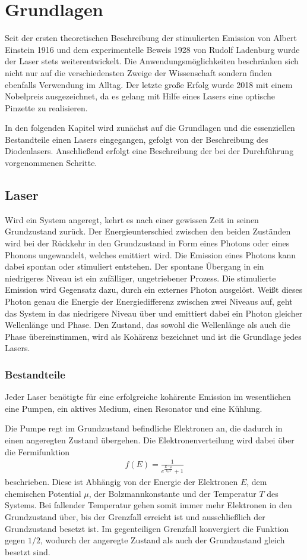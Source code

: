 \section{Grundlagen}
\label{sec:Grundlagen}
Seit der ersten theoretischen Beschreibung der stimulierten Emission von Albert Einstein 1916 und dem experimentelle Beweis 1928 von Rudolf Ladenburg wurde der Laser stets weiterentwickelt. Die Anwendungsmöglichkeiten beschränken sich nicht nur auf die verschiedensten Zweige der Wissenschaft sondern finden ebenfalls Verwendung im Alltag. Der letzte große Erfolg wurde 2018 mit einem Nobelpreis ausgezeichnet, da es gelang mit Hilfe eines Lasers eine optische Pinzette zu realisieren.

In den folgenden Kapitel wird zunächst auf die Grundlagen und die essenziellen Bestandteile einen Lasers eingegangen, gefolgt von der Beschreibung des Diodenlasers. Anschließend erfolgt eine Beschreibung der bei der Durchführung vorgenommenen Schritte.

\subsection{Laser}
Wird ein System angeregt, kehrt es nach einer gewissen Zeit in seinen Grundzustand zurück. Der Energieunterschied zwischen den beiden Zuständen wird bei der Rückkehr in den Grundzustand in Form eines Photons oder eines Phonons ungewandelt, welches emittiert wird. Die Emission eines Photons kann dabei spontan oder stimuliert entstehen. Der spontane Übergang in ein niedrigeres Niveau ist ein zufälliger, ungetriebener Prozess. Die stimulierte Emission wird Gegensatz dazu, durch ein externes Photon ausgelöst. Weißt dieses Photon genau die Energie der Energiedifferenz zwischen zwei Niveaus auf, geht das System in das niedrigere Niveau über und emittiert dabei ein Photon gleicher Wellenlänge und Phase. Den Zustand, das sowohl die Wellenlänge als auch die Phase übereinstimmen, wird als Kohärenz bezeichnet und ist die Grundlage jedes Lasers.

\subsubsection{Bestandteile}
\label{sec:Bestandteile}
Jeder Laser benötigte für eine erfolgreiche kohärente Emission im wesentlichen eine Pumpen, ein aktives Medium, einen Resonator und eine Kühlung.

Die Pumpe regt im Grundzustand befindliche Elektronen an, die dadurch in einen angeregten Zustand übergehen. Die Elektronenverteilung wird dabei über die Fermifunktion
\begin{align}
	f(E)=\frac{1}{e^{\frac{E-\mu}{k_B T}}+1}
\end{align}
beschrieben. Diese ist Abhängig von der Energie der Elektronen $E$, dem chemischen Potential $\mu$, der Bolzmannkonstante und der Temperatur $T$ des Systems. Bei fallender Temperatur gehen somit immer mehr Elektronen in den Grundzustand über, bis der Grenzfall erreicht ist und ausschließlich der Grundzustand besetzt ist. Im gegenteiligen Grenzfall konvergiert die Funktion gegen $1/2$, wodurch der angeregte Zustand als auch der Grundzustand gleich besetzt sind. 


